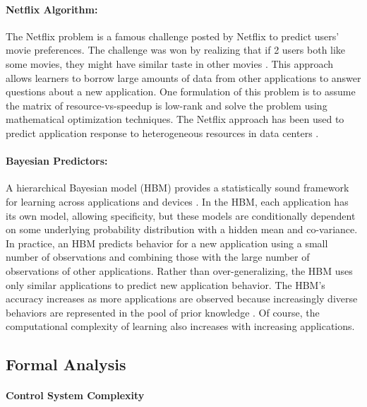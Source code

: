 \paragraph{Netflix Algorithm:}
The Netflix problem is a famous challenge posted by Netflix to predict
users' movie preferences. The challenge was won by realizing that if 2
users both like some movies, they might have similar taste in other
movies \cite{netflix}. This approach allows learners to borrow large
amounts of data from other applications to answer questions about a
new application.  One formulation of this problem is to assume the
matrix of resource-vs-speedup is low-rank and solve the problem
using mathematical optimization techniques.  The Netflix approach has
been used to predict application response to heterogeneous resources
in data centers \cite{Paragon,quasar}.

\paragraph{ Bayesian Predictors:} A hierarchical Bayesian model (HBM)
provides a statistically sound framework for learning across
applications and devices
\cite{gelman2013bayesian,morris1983parametric}.  In the HBM, each
application has its own model, allowing specificity, but these models
are conditionally dependent on some underlying probability
distribution with a hidden mean and co-variance.  In practice, an HBM
predicts behavior for a new application using a small number of
observations and combining those with the large number of observations
of other applications.  Rather than over-generalizing, the HBM uses
only similar applications to predict new application behavior.  The
HBM's accuracy increases as more applications are observed because
increasingly diverse behaviors are represented in the pool of prior
knowledge \cite{LEO}.  Of course, the computational complexity of
learning also increases with increasing applications.


\subsection{Formal Analysis}
\label{sec:guarantees}
\paragraph{Control System Complexity}

